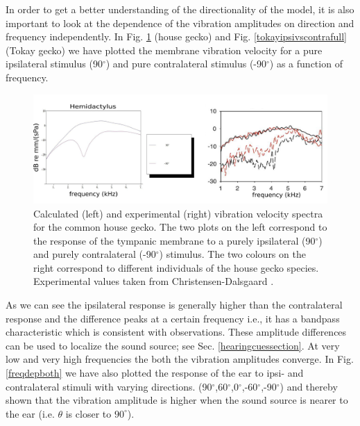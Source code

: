 In order to get a better understanding of the directionality of the model, it is also important to look at the dependence of the vibration amplitudes on direction and frequency independently. 
In Fig. \ref{hemidactylusipsivscontrafull} (house gecko)
and Fig. \ref{tokayipsivscontrafull} (Tokay gecko) we have plotted the membrane vibration velocity for a pure ipsilateral stimulus (90$^\circ$) and pure contralateral stimulus (-90$^\circ$)
as a function of frequency.
\begin{figure}[ht!]
 \centering
 \includegraphics[width=1.0\linewidth]{Diagrams/Plots/hemidactylusipsivscontrafull.png}
 \caption[Frequency dependence of ipsi- and contralateral membrane vibration amplitudes - common house gecko]{Calculated (left) and experimental (right) vibration velocity spectra for the common house gecko. The two plots
 on the left correspond to the response of the tympanic membrane to a purely ipsilateral (90$^\circ$) and purely contralateral (-90$^\circ$) stimulus.  The two colours on the right correspond to
 different individuals of the house gecko species. Experimental values taken from Christensen-Dalsgaard \cite{dalsgaardmanley2}.}
  \label{hemidactylusipsivscontrafull}
\end{figure}
As we can see the ipsilateral response is generally higher than the contralateral response and the difference peaks at a certain frequency i.e., it
has a bandpass characteristic which is consistent with observations.
These amplitude differences can be used to localize the sound source; see Sec. \ref{hearingcuessection}. At very low and very high frequencies the both the vibration amplitudes
converge.  In Fig. \ref{freqdepboth} we  have also plotted the response of the ear to ipsi- and contralateral stimuli with varying directions. (90$^\circ$,60$^\circ$,0$^\circ$,-60$^\circ$,-90$^\circ$)
and thereby shown that the vibration amplitude is higher when the sound source is nearer to the ear (i.e. $\theta$ is closer to $90^\circ$).
